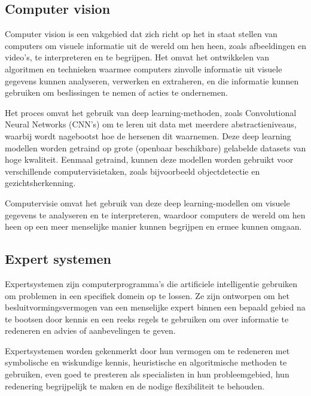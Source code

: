 \cite{franccois2018introduction}

\subsection{Computer vision}

Computer vision is een vakgebied dat zich richt op het in staat stellen van computers om visuele informatie uit de wereld om hen heen, zoals afbeeldingen en video's, te interpreteren en te begrijpen. Het omvat het ontwikkelen van algoritmen en technieken waarmee computers zinvolle informatie uit visuele gegevens kunnen analyseren, verwerken en extraheren, en die informatie kunnen gebruiken om beslissingen te nemen of acties te ondernemen.

Het proces omvat het gebruik van deep learning-methoden, zoals Convolutional Neural Networks (CNN's) om te leren uit data met meerdere abstractieniveaus, waarbij wordt nagebootst hoe de hersenen dit waarnemen. Deze deep learning modellen worden getraind op grote (openbaar beschikbare) gelabelde datasets van hoge kwaliteit. Eenmaal getraind, kunnen deze modellen worden gebruikt voor verschillende computervisietaken, zoals bijvoorbeeld objectdetectie en gezichtsherkenning.

Computervisie omvat het gebruik van deze deep learning-modellen om visuele gegevens te analyseren en te interpreteren, waardoor computers de wereld om hen heen op een meer menselijke manier kunnen begrijpen en ermee kunnen omgaan.

\cite{voulodimos2018deep}

\subsection{Expert systemen}

Expertsystemen zijn computerprogramma's die artificiele intelligentie gebruiken om problemen in een specifiek domein op te lossen. Ze zijn ontworpen om het besluitvormingsvermogen van een menselijke expert binnen een bepaald gebied na te bootsen door kennis en een reeks regels te gebruiken om over informatie te redeneren en advies of aanbevelingen te geven. 

Expertsystemen worden gekenmerkt door hun vermogen om te redeneren met symbolische en wiskundige kennis, heuristische en algoritmische methoden te gebruiken, even goed te presteren als specialisten in hun probleemgebied, hun redenering begrijpelijk te maken en de nodige flexibiliteit te behouden.

